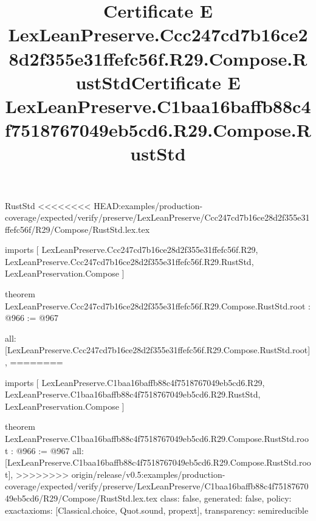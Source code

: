 \begin{lexlean}{RustStd}
<<<<<<<< HEAD:examples/production-coverage/expected/verify/preserve/LexLeanPreserve/Ccc247cd7b16ce28d2f355e31ffefc56f/R29/Compose/RustStd.lex.tex
\title{Certificate E LexLeanPreserve.Ccc247cd7b16ce28d2f355e31ffefc56f.R29.Compose.RustStd}
\begin{coremodule}
imports [
  LexLeanPreserve.Ccc247cd7b16ce28d2f355e31ffefc56f.R29,
  LexLeanPreserve.Ccc247cd7b16ce28d2f355e31ffefc56f.R29.RustStd,
  LexLeanPreservation.Compose
]

theorem LexLeanPreserve.Ccc247cd7b16ce28d2f355e31ffefc56f.R29.Compose.RustStd.root : @966 := @967 {
  all: [LexLeanPreserve.Ccc247cd7b16ce28d2f355e31ffefc56f.R29.Compose.RustStd.root],
========
\title{Certificate E LexLeanPreserve.C1baa16baffb88c4f7518767049eb5cd6.R29.Compose.RustStd}
\begin{coremodule}
imports [
  LexLeanPreserve.C1baa16baffb88c4f7518767049eb5cd6.R29,
  LexLeanPreserve.C1baa16baffb88c4f7518767049eb5cd6.R29.RustStd,
  LexLeanPreservation.Compose
]

theorem LexLeanPreserve.C1baa16baffb88c4f7518767049eb5cd6.R29.Compose.RustStd.root : @966 := @967 {
  all: [LexLeanPreserve.C1baa16baffb88c4f7518767049eb5cd6.R29.Compose.RustStd.root],
>>>>>>>> origin/release/v0.5:examples/production-coverage/expected/verify/preserve/LexLeanPreserve/C1baa16baffb88c4f7518767049eb5cd6/R29/Compose/RustStd.lex.tex
  class: false,
  generated: false,
  policy: exact{axioms: [Classical.choice, Quot.sound, propext]},
  transparency: semireducible
}


\end{coremodule}}
\end{coremodule}
\end{lexlean}
